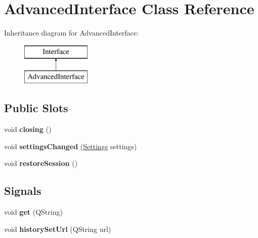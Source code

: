 \hypertarget{classAdvancedInterface}{
\section{AdvancedInterface Class Reference}
\label{classAdvancedInterface}
}
Inheritance diagram for AdvancedInterface:\begin{figure}[H]
\begin{center}
\leavevmode
\includegraphics[height=2cm]{classAdvancedInterface}
\end{center}
\end{figure}
\subsection*{Public Slots}
\begin{DoxyCompactItemize}
\item 
\hypertarget{classAdvancedInterface_a4f6e7117f41f9d43633091d20acc85f8}{
void {\bfseries closing} ()}
\label{classAdvancedInterface_a4f6e7117f41f9d43633091d20acc85f8}

\item 
\hypertarget{classAdvancedInterface_ae22137f0f946dd85e808f24917240369}{
void {\bfseries settingsChanged} (\hyperlink{classSettings}{Settings} settings)}
\label{classAdvancedInterface_ae22137f0f946dd85e808f24917240369}

\item 
\hypertarget{classAdvancedInterface_ae94430b1e4cd09370b735045173b4db5}{
void {\bfseries restoreSession} ()}
\label{classAdvancedInterface_ae94430b1e4cd09370b735045173b4db5}

\end{DoxyCompactItemize}
\subsection*{Signals}
\begin{DoxyCompactItemize}
\item 
\hypertarget{classAdvancedInterface_a68a20613eb2cbf7588259fdaee660e28}{
void {\bfseries get} (QString)}
\label{classAdvancedInterface_a68a20613eb2cbf7588259fdaee660e28}

\item 
\hypertarget{classAdvancedInterface_a860c6b20254fd6114f18bacbf9c04251}{
void {\bfseries historySetUrl} (QString url)}
\label{classAdvancedInterface_a860c6b20254fd6114f18bacbf9c04251}

\end{DoxyCompactItemize}
